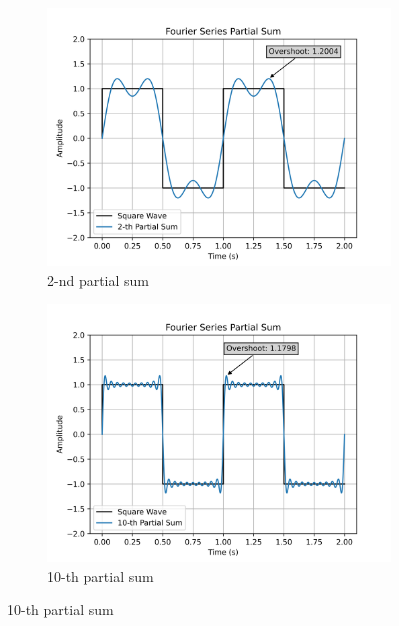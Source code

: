 \documentclass[12pt]{article}
\theoremstyle{definition}
\begin{document}
\begin{figure}[htbp]
    \centering
    \begin{subfigure}[t]{0.45\textwidth}
        \centering
        \includegraphics[width=\textwidth]{2-partial.png}
        \caption{2-nd partial sum}
        \label{fig:2-nd partial sum}
    \end{subfigure}
    \quad
    \begin{subfigure}[t]{0.45\textwidth}
        \centering
        \includegraphics[width=\textwidth]{10-partial.png}
        \caption{10-th partial sum}
        \label{fig:10-th partial sum}
    \end{subfigure}


\end{figure}
\end{document}
